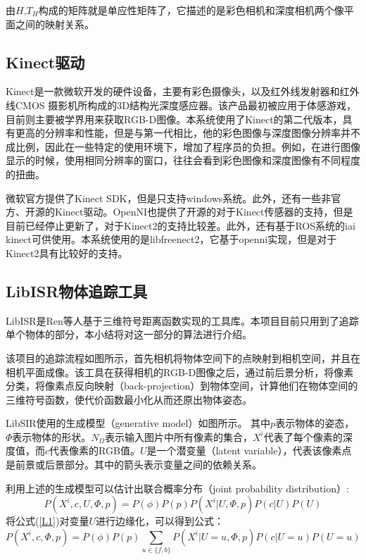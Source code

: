 由$H$,$T_H$构成的矩阵就是单应性矩阵了，它描述的是彩色相机和深度相机两个像平面之间的映射关系。

\subsection{Kinect驱动}
Kinect是一款微软开发的硬件设备，主要有彩色摄像头，以及红外线发射器和红外线CMOS 摄影机所构成的3D结构光深度感应器。该产品最初被应用于体感游戏，目前则主要被学界用来获取RGB-D图像。本系统使用了Kinect的第二代版本，具有更高的分辨率和性能，但是与第一代相比，他的彩色图像与深度图像分辨率并不成比例，因此在一些特定的使用环境下，增加了程序员的负担。例如，在进行图像显示的时候，使用相同分辨率的窗口，往往会看到彩色图像和深度图像有不同程度的扭曲。

微软官方提供了Kinect SDK，但是只支持windows系统。此外，还有一些非官方、开源的Kinect驱动。OpenNI\cite{Openni}也提供了开源的对于Kinect传感器的支持，但是目前已经停止更新了，对于Kinect2的支持比较差。此外，还有基于ROS系统的iai kinect\cite{iai_kinect2}可供使用。本系统使用的是libfreenect2\cite{libfreenect2}，它基于openni实现，但是对于Kinect2具有比较好的支持。

\subsection{LibISR物体追踪工具}
LibISR是Ren等人基于三维符号距离函数实现的工具库\cite{Ren_3DV_2014, star3d_iccv_2013}。本项目目前只用到了追踪单个物体的部分，本小结将对这一部分的算法进行介绍\cite{ren2017real}。

该项目的追踪流程如图所示，首先相机将物体空间下的点映射到相机空间，并且在相机平面成像。该工具在获得相机的RGB-D图像之后，通过前后景分析，将像素分类，将像素点反向映射（back-projection）到物体空间，计算他们在物体空间的三维符号函数，使代价函数最小化从而还原出物体姿态。

LibSIR使用的生成模型（generative model）如图所示。
其中$p$表示物体的姿态，$\Phi$表示物体的形状。$N_\Omega$表示输入图片中所有像素的集合，$X^i$代表了每个像素的深度值，而$c$代表像素的RGB值。$U$是一个潜变量（latent variable），代表该像素点是前景或后景部分。其中的箭头表示变量之间的依赖关系。

利用上述的生成模型可以估计出联合概率分布（joint probability distribution）:
\begin{equation}
 P(X^i, c, U, \Phi, p) = P(\phi)P(p)P(X^i|U, \Phi, p)P(c|U)P(U)\label{L1}
\end{equation}
将公式(\ref{L1})对变量$U$进行边缘化，可以得到公式：
\begin{equation}
 P(X^i, c, \Phi, p) = P(\phi)P(p)\sum_{u\in\{f,b\}}P(X^i|U=u, \Phi, p)P(c|U=u)P(U=u)\label{L2}
\end{equation}

